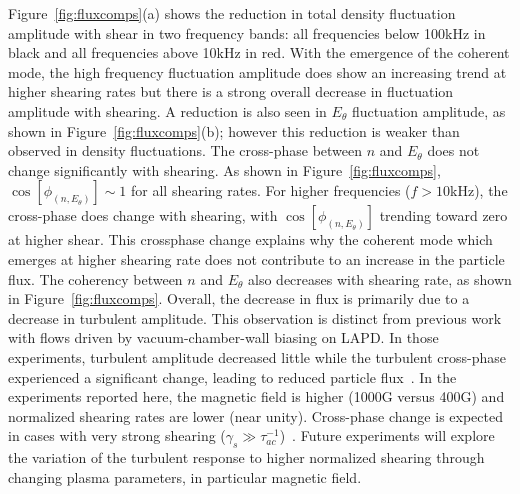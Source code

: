 \documentclass[aps,prl,amsmath,amssymb,reprint,superscriptaddress]{revtex4-1} %
\begin{document}
Figure~\ref{fig:fluxcomps}(a) shows the reduction in total density fluctuation amplitude with shear in two frequency bands: all frequencies below 100kHz in black and all frequencies above 10kHz in red. With the emergence of the coherent mode, the
high frequency fluctuation amplitude does show an increasing trend at higher shearing
rates but there is a strong overall decrease in fluctuation amplitude with shearing.
A reduction is also seen in $E_\theta$ fluctuation amplitude, as shown in
Figure~\ref{fig:fluxcomps}(b); however this reduction is weaker than
observed in density fluctuations.  The cross-phase between
$n$ and $E_\theta$ does not change significantly with
shearing. As shown in Figure~\ref{fig:fluxcomps},
$\cos[\phi_{(n,E_\theta)}] \sim 1$ for all shearing rates.  For
higher frequencies ($f > 10$kHz), the cross-phase does change with
shearing, with $\cos[\phi_{(n,E_\theta)}]$ trending toward zero at
higher shear.  This crossphase change explains why the coherent mode
which emerges at higher shearing rate does not contribute to an
increase in the particle flux.  The coherency between $n$ and
$E_\theta$ also decreases with shearing rate, as shown in 
Figure~\ref{fig:fluxcomps}.  Overall, the decrease in flux is primarily
due to a decrease in turbulent amplitude.  This observation is distinct from previous work with flows driven by vacuum-chamber-wall
biasing on LAPD. In those experiments, turbulent amplitude decreased little while the
turbulent cross-phase experienced a significant change, leading to
reduced particle flux~\cite{carter09}.  In the experiments reported
here, the magnetic field is higher (1000G versus 400G) and normalized
shearing rates are lower (near unity).  Cross-phase change is expected
in cases with very strong shearing ($\gamma_{s} \gg \tau_{ac}^{-1}$)~\cite{terry01}.  Future experiments will explore the
variation of the turbulent response to higher normalized shearing
through changing plasma parameters, in particular magnetic field.  
\end{document}
